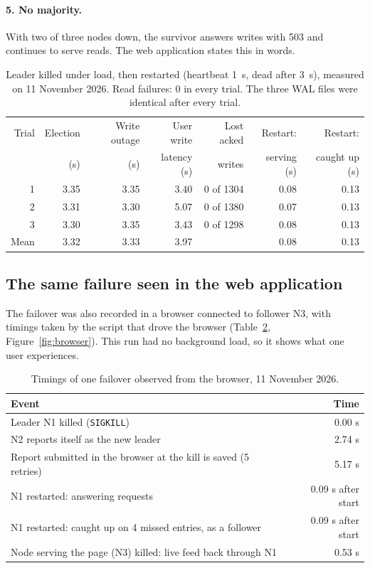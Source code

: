 \documentclass[10pt,a4paper]{article}
\newcommand{\code}[1]{\texttt{#1}}
\begin{document}
\paragraph{5. No majority.} With two of three nodes down, the survivor answers writes with 503
and continues to serve reads. The web application states this in words.

\begin{table}[H]
\centering
\begin{tabular}{@{}rrrrrrr@{}}
\toprule
Trial & Election & Write outage & User write & Lost acked & Restart: & Restart: \\
 & (s) & (s) & latency (s) & writes & serving (s) & caught up (s) \\
\midrule
1 & 3.35 & 3.35 & 3.40 & 0 of 1304 & 0.08 & 0.13 \\
2 & 3.31 & 3.30 & 5.07 & 0 of 1380 & 0.07 & 0.13 \\
3 & 3.30 & 3.35 & 3.43 & 0 of 1298 & 0.08 & 0.13 \\
\midrule
Mean & 3.32 & 3.33 & 3.97 & & 0.08 & 0.13 \\
\bottomrule
\end{tabular}
\caption{Leader killed under load, then restarted (heartbeat 1~s, dead after 3~s), measured on
11 November 2026. Read failures: 0 in every trial. The three WAL files were identical after every
trial.}
\label{tab:fail}
\end{table}

\subsection{The same failure seen in the web application}

The failover was also recorded in a browser connected to follower N3, with timings taken by the
script that drove the browser (Table~\ref{tab:browser}, Figure~\ref{fig:browser}). This run had
no background load, so it shows what one user experiences.

\begin{table}[H]
\centering\small
\begin{tabular}{@{}lr@{}}
\toprule
Event & Time \\
\midrule
Leader N1 killed (\code{SIGKILL}) & 0.00 s \\
N2 reports itself as the new leader & 2.74 s \\
Report submitted in the browser at the kill is saved (5 retries) & 5.17 s \\
\midrule
N1 restarted: answering requests & 0.09 s after start \\
N1 restarted: caught up on 4 missed entries, as a follower & 0.09 s after start \\
\midrule
Node serving the page (N3) killed: live feed back through N1 & 0.53 s \\
\bottomrule
\end{tabular}
\caption{Timings of one failover observed from the browser, 11 November 2026.}
\label{tab:browser}
\end{table}
\end{document}
